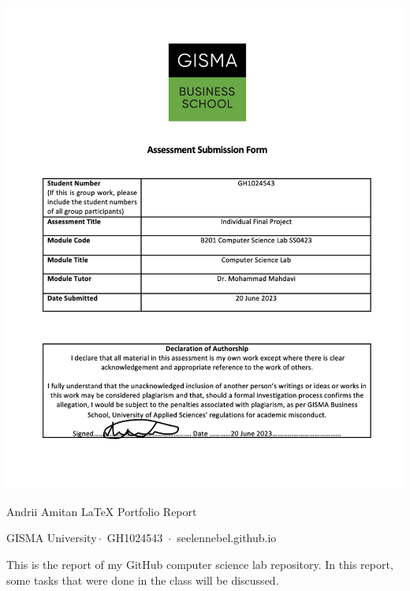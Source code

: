 \documentclass[a4paper,11pt]{article}
\begin{document}
\begin{center}
\includegraphics[scale=1.1]{sub.png}
\end{center}

\begin{minipage}{\textwidth}
    \vspace{7ex}
        \par{
        \centering
        \vspace{-0.9in}
            \textcolor{linkcolour}{\Large Andrii Amitan LaTeX Portfolio Report}
        \par}
\end{minipage}

\begin{center}
    GISMA University\,$\cdot$\, {GH1024543} \,$\cdot$\, {seelennebel.github.io}
\end{center}

This is the report of my GitHub computer science lab repository. In this report, some tasks that were done in the class will be discussed.
\end{document}
